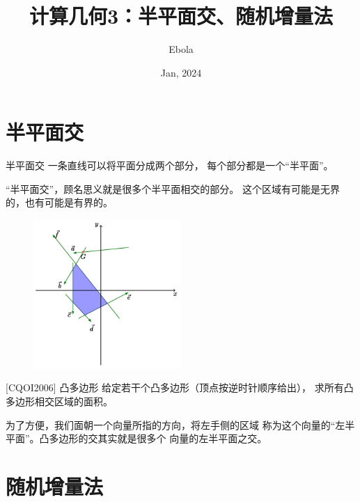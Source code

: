 \documentclass{beamer}
\author{Ebola}
\title{计算几何3：半平面交、随机增量法}
\institute{
    Institute of Mathematics, \\
    Zhejiang University.
}
\date{Jan, 2024}
\begin{document}
\begin{frame}
    \titlepage
\end{frame}

\begin{frame}
    \tableofcontents[sectionstyle=show,subsectionstyle=show/shaded/hide,subsubsectionstyle=show/shaded/hide]
\end{frame}

\section{半平面交}

\begin{frame}{半平面交}
    \small
    一条直线可以将平面分成两个部分，
    每个部分都是一个“半平面”。

    \vspace{1em}
    “半平面交”，顾名思义就是很多个半平面相交的部分。
    这个区域有可能是无界的，也有可能是有界的。

    \begin{figure}[H]
        \centering
        \includegraphics[width=0.5\textwidth]{pic/halfplane_2.png}
    \end{figure}
\end{frame}

\begin{frame}{[CQOI2006] 凸多边形}
    \small
    给定若干个凸多边形（顶点按逆时针顺序给出），
    求所有凸多边形相交区域的面积。

    \vspace{1em}
    为了方便，我们面朝一个向量所指的方向，将左手侧的区域
    称为这个向量的“左半平面”。凸多边形的交其实就是很多个
    向量的左半平面之交。
\end{frame}

\section{随机增量法}
\end{document}
